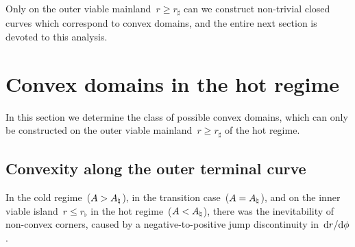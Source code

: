 Only on the outer viable mainland~$r \ge r_\sharp$
can we construct non-trivial closed curves
which correspond to convex domains,
and the entire next section is devoted to this analysis.

\section{Convex domains in the hot regime}
\label{sec:polar.convex}

In this section
we determine the class of possible convex domains,
which can only be constructed
on the outer viable mainland~$r \ge r_\sharp$
of the hot regime.

\subsection{Convexity along the outer terminal curve}
\label{sec:polar.convex.terminal}

In the cold regime~($A > A_\natural$), in the transition case~($A = A_\natural$),
and on the inner viable island~$r \le r_\flat$
in the hot regime~($A < A_\natural$),
there was the inevitability of non-convex corners,
caused by a negative-to-positive jump discontinuity in~$\mathop{}\!\mathrm{d} r / {\mathop{}\!\mathrm{d}\phi}$.

